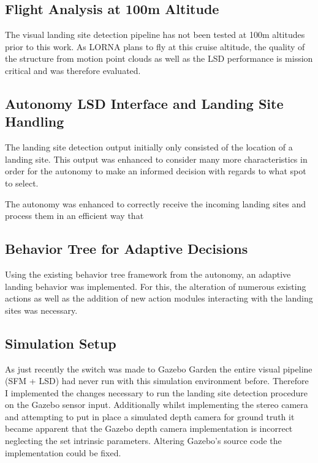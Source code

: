 
\subsection{Flight Analysis at 100m Altitude}
The visual landing site detection pipeline has not been tested at 100m altitudes prior to this work. As LORNA plans to fly at this cruise altitude, the quality of the structure from motion point clouds as well as the LSD performance is mission critical and was therefore evaluated. %
\subsection{Autonomy LSD Interface and Landing Site Handling}
The landing site detection output initially only consisted of the location of a landing site. This output was enhanced to consider many more characteristics in order for the autonomy to make an informed decision with regards to what spot to select.

The autonomy was enhanced to correctly receive the incoming landing sites and process them in an efficient way that
\subsection{Behavior Tree for Adaptive Decisions}

Using the existing behavior tree framework from the autonomy, an adaptive landing behavior was implemented. For this, the alteration of numerous existing actions as well as the addition of new action modules interacting with the landing sites was necessary.
\subsection{Simulation Setup}
As just recently the switch was made to Gazebo Garden the entire visual pipeline (SFM + LSD) had never run with this simulation environment before. Therefore I implemented the changes necessary to run the landing site detection procedure on the Gazebo sensor input. Additionally whilst implementing the stereo camera and attempting to put in place a simulated depth camera for ground truth it became apparent that the Gazebo depth camera implementation is incorrect neglecting the set intrinsic parameters. Altering Gazebo's source code the implementation could be fixed.
